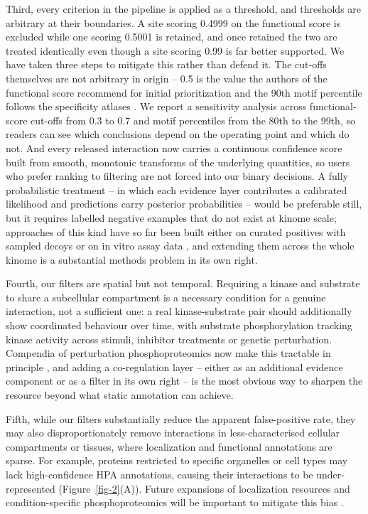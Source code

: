 \documentclass[
  number,
  preprint,
  onecolumn]{elsarticle}
\begin{document}
Third, every criterion in the pipeline is applied as a threshold, and
thresholds are arbitrary at their boundaries. A site scoring 0.4999 on
the functional score is excluded while one scoring 0.5001 is retained,
and once retained the two are treated identically even though a site
scoring 0.99 is far better supported. We have taken three steps to
mitigate this rather than defend it. The cut-offs themselves are not
arbitrary in origin -- 0.5 is the value the authors of the functional
score recommend for initial prioritization \citep{Ochoa2020-og} and the
90th motif percentile follows the specificity atlases
\citep{Johnson2023-ai, Yaron-Barir2024-lv}. We report a sensitivity
analysis across functional-score cut-offs from 0.3 to 0.7 and motif
percentiles from the 80th to the 99th, so readers can see which
conclusions depend on the operating point and which do not. And every
released interaction now carries a continuous confidence score built
from smooth, monotonic transforms of the underlying quantities, so users
who prefer ranking to filtering are not forced into our binary
decisions. A fully probabilistic treatment -- in which each evidence
layer contributes a calibrated likelihood and predictions carry
posterior probabilities -- would be preferable still, but it requires
labelled negative examples that do not exist at kinome scale; approaches
of this kind have so far been built either on curated positives with
sampled decoys or on in vitro assay data
\citep{Invergo2022-iv, Horn2014-kx}, and extending them across the whole
kinome is a substantial methods problem in its own right.

Fourth, our filters are spatial but not temporal. Requiring a kinase and
substrate to share a subcellular compartment is a necessary condition
for a genuine interaction, not a sufficient one: a real kinase-substrate
pair should additionally show coordinated behaviour over time, with
substrate phosphorylation tracking kinase activity across stimuli,
inhibitor treatments or genetic perturbation. Compendia of perturbation
phosphoproteomics now make this tractable in principle
\citep{Ochoa2016-kr, Muller-Dott2025-yf}, and adding a co-regulation
layer -- either as an additional evidence component or as a filter in
its own right -- is the most obvious way to sharpen the resource beyond
what static annotation can achieve.

Fifth, while our filters substantially reduce the apparent
false-positive rate, they may also disproportionately remove
interactions in less-characterised cellular compartments or tissues,
where localization and functional annotations are sparse. For example,
proteins restricted to specific organelles or cell types may lack
high-confidence HPA annotations, causing their interactions to be
under-represented (Figure~\ref{fig-2}(A)). Future expansions of
localization resources and condition-specific phosphoproteomics will be
important to mitigate this bias \citep{Thul2017-cl, Uhlen2015-sd}.
\end{document}
